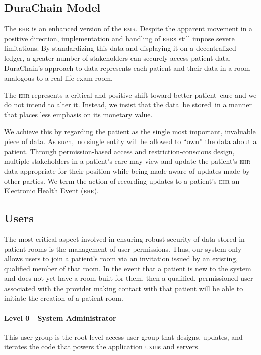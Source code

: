 \subsection{DuraChain Model}
The \textsc{ehr} is an enhanced version of the \textsc{emr}. Despite the apparent movement in a positive direction, implementation and handling of \textsc{ehr}s still impose severe limitations.\cite{palmaEHR} By standardizing this data and displaying it on a decentralized ledger, a greater number of stakeholders can securely access patient data. DuraChain’s approach to data represents each patient and their data in a room analogous to a real life exam room.%

The \textsc{ehr} represents a critical and positive shift toward better patient care and we do not intend to alter it. Instead, we insist that the data be stored in a manner that places less emphasis on its monetary value.%

We achieve this by regarding the patient as the single most important, invaluable piece of data. As such, no single entity will be allowed to ``own'' the data about a patient. Through permission-based access and restriction-conscious design, multiple stakeholders in a patient’s care may view and update the patient's \textsc{ehr} data appropriate for their position while being made aware of updates made by other parties. We term the action of recording updates to a patient’s \textsc{ehr} an Electronic Health Event (\textsc{ehe}).%

\subsection{Users}
The most critical aspect involved in ensuring robust security of data stored in patient rooms is the management of user permissions. Thus, our system only allows users to join a patient's room via an invitation issued by an existing, qualified member of that room. In the event that a patient is new to the system and does not yet have a room built for them, then a qualified, permissioned user associated with the provider making contact with that patient will be able to initiate the creation of a patient room.%

\paragraph{Level 0---System Administrator}
This user group is the root level access user group that designs, updates, and iterates the code that powers the application \textsc{uxui}s and servers.%

